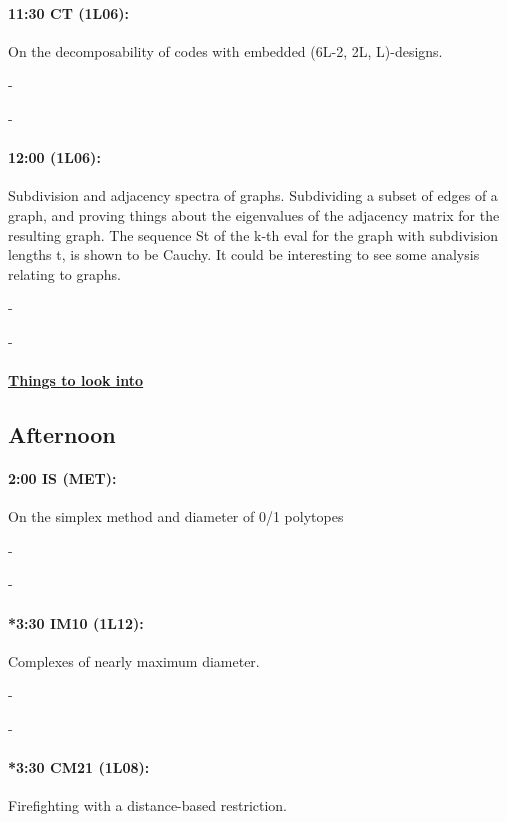 \documentclass[12]{article}
\theoremstyle{definition}
\begin{document}
	\paragraph{11:30 CT (1L06):} On the decomposability of codes with embedded (6L-2, 2L, L)-designs.
	
	-
	
	-
	
	\paragraph{12:00 (1L06):} Subdivision and adjacency spectra of graphs.
	Subdividing a subset of edges of a graph, and proving things about the eigenvalues of the adjacency matrix for the resulting graph.  The sequence St of the k-th eval for the graph with subdivision lengths t, is shown to be Cauchy.  It could be interesting to see some analysis relating to graphs.
	
	-
	
	-
	
	\begin{center} 
		\item\paragraph{\underline{Things to look into}} 
	\end{center}

	
	\newpage
	\subsection{Afternoon}
	
	\paragraph{2:00 IS (MET):} On the simplex method and diameter of 0/1 polytopes
	
	-
	
	-
	
	\paragraph{*3:30 IM10 (1L12):} Complexes of nearly maximum diameter.
	
	-
	
	-
	
	\paragraph{*3:30 CM21 (1L08):} Firefighting with a distance-based restriction.
	
\end{document}
